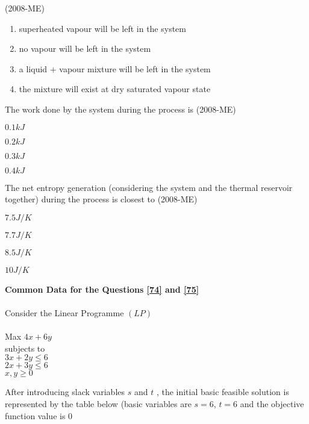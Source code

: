  \hfill(2008-ME)
 \begin{enumerate}
     \item superheated vapour will be left in the system 
     \item no vapour will be left in the system 
     \item a liquid $+$ vapour mixture will be left in the system 
     \item the mixture will exist at dry saturated vapour state 
 \end{enumerate}
 \item The work done by the system during the process is \label{72} \hfill(2008-ME) 
 \begin{enumerate}
     \begin{multicols}{4}
         \item $0.1kJ$
         \item $0.2kJ$
         \item $0.3kJ$
         \item $0.4kJ$
     \end{multicols}
 \end{enumerate}
\item The net entropy generation (considering the system and the thermal reservoir together) during the process is closest to \label{73} \hfill(2008-ME)
\begin{enumerate}
    \begin{multicols}{4}
        \item $7.5J/K$
        \item $7.7J/K$
        \item $8.5J/K$
        \item $10J/K$
    \end{multicols}
\end{enumerate}
\textbf{Common Data for the Questions \ref{74} and \ref{75}} \\ \\
Consider the Linear Programme $(LP)$ \\ \\
Max $4x+6y$ \\ subjects to \\ $3x+2y \leq 6$ \\ $2x+3y \leq 6$ \\
$x,y \geq 0$ \\ 
\item After introducing slack variables $s$
 and $t$
, the initial basic feasible solution is represented by the table below (basic variables are $s = 6$, $t = 6$
 and the objective function value is $0$
